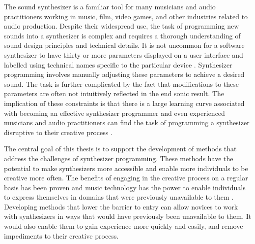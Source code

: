 \label{chapter:introduction}
The sound synthesizer is a familiar tool for many musicians and audio practitioners working in music, film, video games, and other industries related to audio production. Despite their widespread use, the task of programming new sounds into a synthesizer is complex and requires a thorough understanding of sound design principles and technical details. It is not uncommon for a software synthesizer to have thirty or more parameters displayed on a user interface and labelled using technical names specific to the particular device \cite{rasmussen2018evaluating}. Synthesizer programming involves manually adjusting these parameters to achieve a desired sound. The task is further complicated by the fact that modifications to these parameters are often not intuitively reflected in the end sonic result. The implication of these constraints is that there is a large learning curve associated with becoming an effective synthesizer programmer and even experienced musicians and audio practitioners can find the task of programming a synthesizer disruptive to their creative process \cite{krekovic2019insights}. %

The central goal of this thesis is to support the development of methods that address the challenges of synthesizer programming. These methods have the potential to make synthesizers more accessible and enable more individuals to be creative more often. The benefits of engaging in the creative process on a regular basis has been proven \cite{conner2018everyday} and music technology has the power to enable individuals to express themselves in domains that were previously unavailable to them \cite{tavana2015democracy}. Developing methods that lower the barrier to entry can allow novices to work with synthesizers in ways that would have previously been unavailable to them. It would also enable them to gain experience more quickly and easily, and remove impediments to their creative process.

